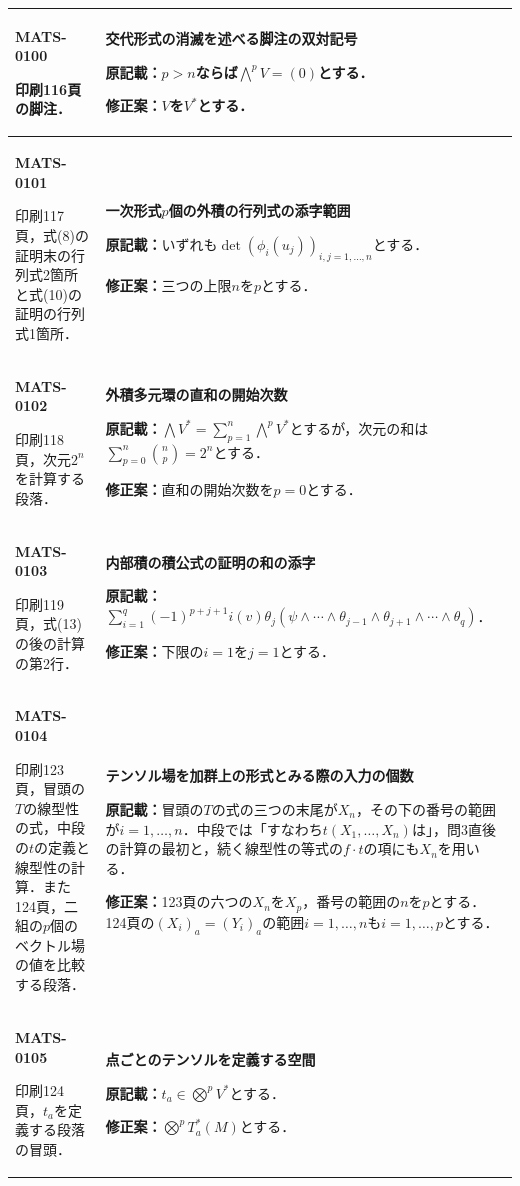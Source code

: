 \documentclass[a4paper,10pt]{ltjsarticle}
\begin{document}
\begin{longtable}{@{}>{\raggedright\arraybackslash}p{.19\linewidth}>{\raggedright\arraybackslash}p{.77\linewidth}@{}}
\hline
\hypertarget{MATS-0100}{}\textbf{MATS-0100}\par 印刷116頁の脚注． & \textbf{交代形式の消滅を述べる脚注の双対記号}\par\textbf{原記載：}$p>n$ならば$\overset p\bigwedge V=(0)$とする．\par\textbf{修正案：}$V$を$V^*$とする． \\[3pt]
\hline
\hypertarget{MATS-0101}{}\textbf{MATS-0101}\par 印刷117頁，式(8)の証明末の行列式2箇所と式(10)の証明の行列式1箇所． & \textbf{一次形式$p$個の外積の行列式の添字範囲}\par\textbf{原記載：}いずれも$\det(\phi_i(u_j))_{i,j=1,\ldots,n}$とする．\par\textbf{修正案：}三つの上限$n$を$p$とする． \\[3pt]
\hline
\hypertarget{MATS-0102}{}\textbf{MATS-0102}\par 印刷118頁，次元$2^n$を計算する段落． & \textbf{外積多元環の直和の開始次数}\par\textbf{原記載：}$\bigwedge V^*=\sum_{p=1}^n\overset p\bigwedge V^*$とするが，次元の和は$\sum_{p=0}^n\binom np=2^n$とする．\par\textbf{修正案：}直和の開始次数を$p=0$とする． \\[3pt]
\hline
\hypertarget{MATS-0103}{}\textbf{MATS-0103}\par 印刷119頁，式(13)の後の計算の第2行． & \textbf{内部積の積公式の証明の和の添字}\par\textbf{原記載：}$\sum_{i=1}^q(-1)^{p+j+1}i(v)\theta_j(\psi\wedge\cdots\wedge\theta_{j-1}\wedge\theta_{j+1}\wedge\cdots\wedge\theta_q)$．\par\textbf{修正案：}下限の$i=1$を$j=1$とする． \\[3pt]
\hline
\hypertarget{MATS-0104}{}\textbf{MATS-0104}\par 印刷123頁，冒頭の$T$の線型性の式，中段の$t$の定義と線型性の計算．また124頁，二組の$p$個のベクトル場の値を比較する段落． & \textbf{テンソル場を加群上の形式とみる際の入力の個数}\par\textbf{原記載：}冒頭の$T$の式の三つの末尾が$X_n$，その下の番号の範囲が$i=1,\ldots,n$．中段では「すなわち$t(X_1,\ldots,X_n)$は」，問3直後の計算の最初と，続く線型性の等式の$f\cdot t$の項にも$X_n$を用いる．\par\textbf{修正案：}123頁の六つの$X_n$を$X_p$，番号の範囲の$n$を$p$とする．124頁の$(X_i)_a=(Y_i)_a$の範囲$i=1,\ldots,n$も$i=1,\ldots,p$とする． \\[3pt]
\hline
\hypertarget{MATS-0105}{}\textbf{MATS-0105}\par 印刷124頁，$t_a$を定義する段落の冒頭． & \textbf{点ごとのテンソルを定義する空間}\par\textbf{原記載：}$t_a\in\overset p\bigotimes V^*$とする．\par\textbf{修正案：}$\overset p\bigotimes T_a^*(M)$とする． \\[3pt]

\end{longtable}
\end{document}

